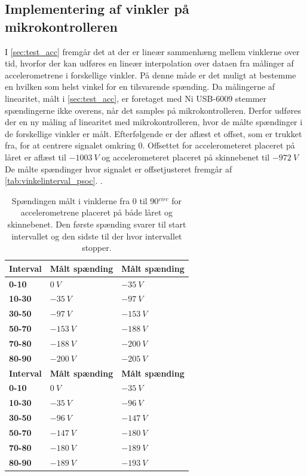 \subsection{Implementering af vinkler på mikrokontrolleren}
I \autoref{sec:test_acc} fremgår det at der er lineær sammenhæng mellem vinklerne over tid, hvorfor der kan udføres en lineær interpolation over dataen fra målinger af accelerometrene i forskellige vinkler. På denne måde er det muligt at bestemme en hvilken som helst vinkel for en tilsvarende  spænding. Da målingerne af linearitet, målt i \autoref{sec:test_acc}, er foretaget med Ni USB-6009 stemmer spændingerne ikke overens, når det samples på mikrokontrolleren. Derfor udføres der en ny måling af linearitet med mikrokontrolleren, hvor de målte spændinger i de forskellige vinkler er målt. Efterfølgende er der aflæst et offset, som er trukket fra, for at centrere signalet omkring 0. Offsettet for accelerometeret placeret på låret er aflæst til $-1003~V$ og accelerometeret placeret på skinnebenet til $-972~V$  De målte spændinger hvor signalet er offsetjusteret fremgår af \autoref{tab:vinkelinterval_psoc}. .

\begin{table}[H]
	\centering
	\begin{tabular}{|l|l|l|}
	\textbf{Interval} & \textbf{Målt spænding} & \textbf{Målt spænding} 	\\ \hline	
    \textbf{0-10} 			& $0~V$							& $-35~V$    \\ \hline
    \textbf{10-30} 			& $-35~V$						& $-97~V$	\\ \hline
    \textbf{30-50} 			& $-97~V$						& $-153~V$	\\ \hline
    \textbf{50-70} 			& $-153~V$						& $-188~V$	\\ \hline
    \textbf{70-80} 			& $-188~V$						& $-200~V$	\\ \hline
    \textbf{80-90} 			& $-200~V$						& $-205~V$	\\ \hline
    	\textbf{Interval} & \textbf{Målt spænding} & \textbf{Målt spænding} 		\\ \hline	
    \textbf{0-10}			& $0~V$ 							& $-35~V$	    \\ \hline
    \textbf{10-30}			& $-35~V$						& $-96~V$	 	\\ \hline
    \textbf{30-50}			& $-96~V$						& $-147~V$		\\ \hline
    \textbf{50-70}			& $-147~V$						& $-180~V$		\\ \hline
    \textbf{70-80}			& $-180~V$						& $-189~V$	 	\\ \hline
     \textbf{80-90}			& $-189~V$						& $-193~V$	 	\\ \hline
	\end{tabular}
	\caption{Spændingen målt i vinklerne fra 0 til 90$^{circ}$ for accelerometrene placeret på både låret og skinnebenet. Den første spænding svarer til start intervallet og den sidste til der hvor intervallet stopper.}
	\label{tab:vinkelinterval_psoc}
\end{table}

